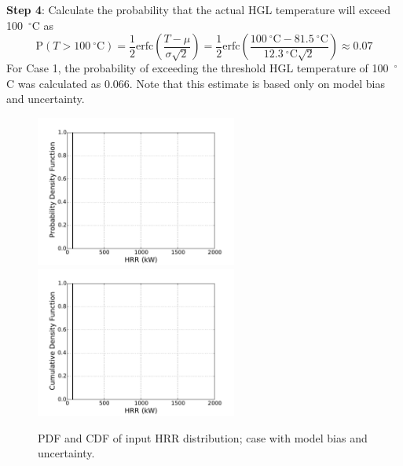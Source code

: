\documentclass[12pt]{article}
\begin{document}
\textbf{Step 4}: Calculate the probability that the actual HGL temperature will exceed 100~$^\circ$C as
\begin{equation}
\textrm{P}(T > 100~^\circ\textrm{C}) = \frac{1}{2} \textrm{erfc} \left( \frac{T - \mu}{\sigma \sqrt{2}} \right) = \frac{1}{2} \textrm{erfc} \left( \frac{100~^\circ\textrm{C} - 81.5~^\circ\textrm{C}}{12.3~^\circ\textrm{C} \sqrt{2}} \right) \approx 0.07
\end{equation}
For Case 1, the probability of exceeding the threshold HGL temperature of 100~$^\circ$C was calculated as 0.066. Note that this estimate is based only on model bias and uncertainty.


\clearpage


\begin{figure}[p]
\includegraphics[width=2.6in]{Figures/input_PDF_point}
\includegraphics[width=2.6in]{Figures/input_CDF_point}
\caption{PDF and CDF of input HRR distribution; case with model bias and uncertainty.}
\label{fig:case_1_input_distributions}
\end{figure}
\end{document}
